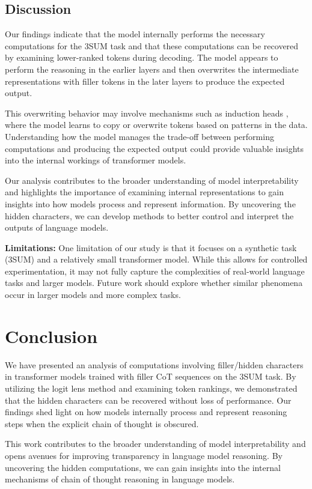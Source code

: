 \documentclass{article}
\begin{document}
\subsection{Discussion}

Our findings indicate that the model internally performs the necessary computations for the 3SUM task and that these computations can be recovered by examining lower-ranked tokens during decoding. The model appears to perform the reasoning in the earlier layers and then overwrites the intermediate representations with filler tokens in the later layers to produce the expected output.

This overwriting behavior may involve mechanisms such as induction heads \cite{elhage2021mathematical}, where the model learns to copy or overwrite tokens based on patterns in the data. Understanding how the model manages the trade-off between performing computations and producing the expected output could provide valuable insights into the internal workings of transformer models.

Our analysis contributes to the broader understanding of model interpretability and highlights the importance of examining internal representations to gain insights into how models process and represent information. By uncovering the hidden characters, we can develop methods to better control and interpret the outputs of language models.

\textbf{Limitations:} One limitation of our study is that it focuses on a synthetic task (3SUM) and a relatively small transformer model. While this allows for controlled experimentation, it may not fully capture the complexities of real-world language tasks and larger models. Future work should explore whether similar phenomena occur in larger models and more complex tasks.

\newpage
\section{Conclusion}

We have presented an analysis of computations involving filler/hidden characters in transformer models trained with filler CoT sequences on the 3SUM task. By utilizing the logit lens method and examining token rankings, we demonstrated that the hidden characters can be recovered without loss of performance. Our findings shed light on how models internally process and represent reasoning steps when the explicit chain of thought is obscured.

This work contributes to the broader understanding of model interpretability and opens avenues for improving transparency in language model reasoning. By uncovering the hidden computations, we can gain insights into the internal mechanisms of chain of thought reasoning in language models.
\end{document}
